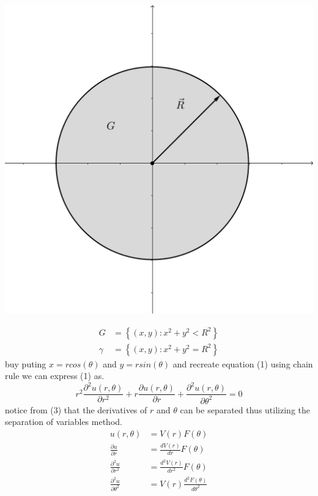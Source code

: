 \documentclass[]{article}
\begin{document}
\begin{center}
\includegraphics[scale=0.17]{circle.png}
\end{center}
\begin{align*}
G &= \left\lbrace (x,y):x^2+y^2 < R^2 \right\rbrace
\\
\gamma &= \left\lbrace (x,y):x^2+y^2 = R^2 \right\rbrace
\end{align*}
buy puting $x = r cos(\theta)$ and $y = r sin(\theta)$ and recreate equation (1) using chain rule we can express (1) as.
\begin{equation}
r^2 \frac{\partial^2 u(r,\theta)}{\partial r^2} + r \frac{\partial u(r,\theta)}{\partial r} + \frac{\partial^2 u(r,\theta)}{\partial \theta^2} = 0
\end{equation}
notice from (3) that the derivatives of $r$ and $\theta$ can be separated thus utilizing the separation of variables method.
\begin{align*}
u(r,\theta) &= V(r)F(\theta)
\\
\frac{\partial u}{\partial r} &= \frac{d V(r)}{dr}F(\theta)
\\
\frac{\partial^2 u}{\partial r^2} &= \frac{d^2 V(r)}{dr^2}F(\theta)
\\
\frac{\partial^2 u}{\partial \theta^2} &= V(r)\frac{d^2 F(\theta)}{d\theta^2}
\end{align*}
\end{document}

